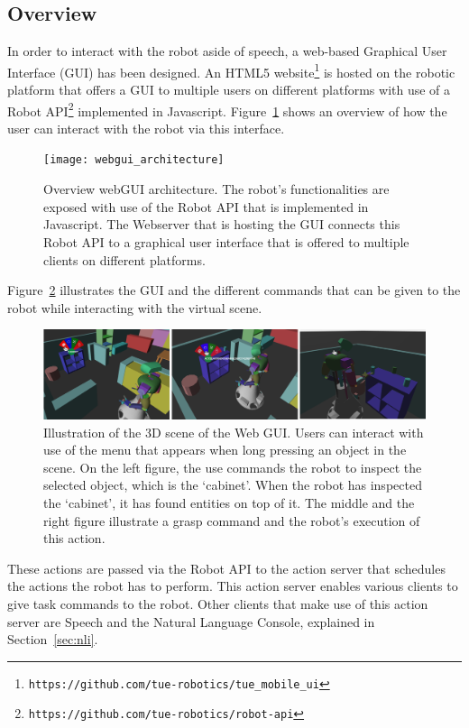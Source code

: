 \subsection*{Overview}

In order to interact with the robot aside of speech, a web-based Graphical User Interface (GUI) has been designed. An HTML5 website\footnote{\texttt{https://github.com/tue-robotics/tue\_mobile\_ui}} is hosted on the robotic platform that offers a GUI to multiple users on different platforms with use of a Robot API\footnote{\texttt{https://github.com/tue-robotics/robot-api}} implemented in Javascript. Figure~\ref{fig:webgui_architecture} shows an overview of how the user can interact with the robot via this interface. 
\begin{figure}[H]
        \texttt{[image: webgui\_architecture]}
        \caption{Overview webGUI architecture. The robot's functionalities are exposed with use of the Robot API that is implemented in Javascript. The Webserver that is hosting the GUI connects this Robot API to a graphical user interface that is offered to multiple clients on different platforms.}
        \label{fig:webgui_architecture}
\end{figure}
Figure~\ref{fig:gui_actions} illustrates the GUI and the different commands that can be given to the robot while interacting with the virtual scene.


\begin{figure}[H]
        \includegraphics[width = \linewidth]{Figures/gui_actions}
        \caption{Illustration of the 3D scene of the Web GUI. Users can interact with use of the menu that appears when long pressing an object in the scene. On the left figure, the use commands the robot to inspect the selected object, which is the `cabinet'. When the robot has inspected the `cabinet', it has found entities on top of it. The middle and the right figure illustrate a grasp command and the robot's execution of this action.}
        \label{fig:gui_actions}
\end{figure}

These actions are passed via the Robot API to the action server that schedules the actions the robot has to perform. This action server enables various clients to give task commands to the robot. Other clients that make use of this action server are Speech and the Natural Language Console, explained in Section~\ref{sec:nli}.

